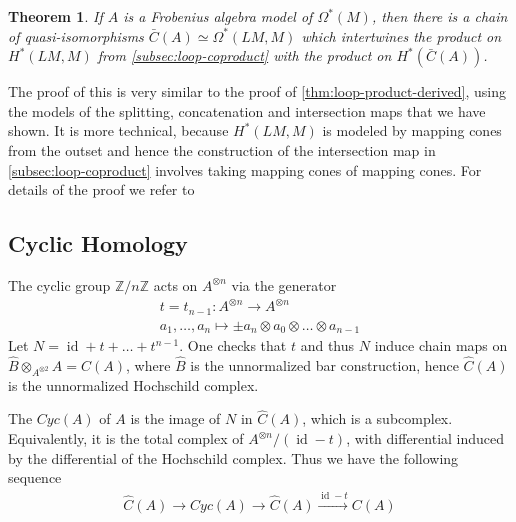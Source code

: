 \documentclass{scrartcl}
\let\emph\relax
\theoremstyle{plain}
\newtheorem{theorem}{Theorem}[section]
\theoremstyle{definition}
\newcommand{\Z}{\mathbb Z}
\newcommand{\quiso}{\simeq}
\let\xto\xrightarrow
\DeclareMathOperator{\id}{id}
\DeclareMathOperator{\Map}{Map}
\begin{document}
\begin{theorem}{\cite[Thm. 1.3]{naef2019string}}
    If $A$ is a Frobenius algebra model of $\Omega^*(M)$, then there is a chain of quasi-isomorphisms $\bar C(A)\quiso \Omega^*(LM, M)$ which intertwines the product on $H^*(LM, M)$ from \cref{subsec:loop-coproduct} with the product on $H^*(\bar C(A))$.
\end{theorem}
The proof of this is very similar to the proof of \cref{thm:loop-product-derived}, using the models of the splitting, concatenation and intersection maps that we have shown. It is more technical, because $H^*(LM, M)$ is modeled by mapping cones from the outset and hence the construction of the intersection map in \cref{subsec:loop-coproduct} involves taking mapping cones of mapping cones. For details of the proof we refer to \cite[Sec. 6]{naef2019string}

\subsection{Cyclic Homology}
The cyclic group $\Z/n\Z$ acts on $A^{\otimes n}$ via the generator
\begin{align*}
    t=t_{n-1}\colon A^{\otimes n}\to A^{\otimes n} \\
    a_1, \dots, a_n \mapsto \pm a_n\otimes a_0\otimes\dots\otimes a_{n-1}
\end{align*}
Let $N = \id+t+\dots+t^{n-1}$. One checks that $t$ and thus $N$ induce chain maps on $\hat B\otimes_{A^{\otimes 2}} A = \hat C(A)$, where $\hat B$ is the unnormalized bar construction, hence $\hat C(A)$ is the unnormalized Hochschild complex. 

The \emph{cyclic complex} $Cyc(A)$ of $A$ is the image of $N$ in $\hat C(A)$, which is a subcomplex.  Equivalently, it is the total complex of $A^{\otimes n} / (\id-t)$, with differential induced by the differential of the Hochschild complex. 
Thus we have the following sequence
\begin{align*}
    \hat C(A) \to Cyc(A) \to \hat C(A) \xto{\id-t} C(A)
\end{align*}
\end{document}
